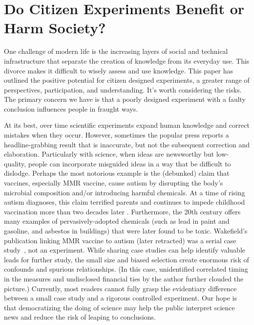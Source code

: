 \section{Do Citizen  Experiments Benefit or Harm Society?}
One challenge of modern life is the increasing layers of social and technical infrastructure that separate the creation of knowledge from its everyday use. This divorce makes it difficult to wisely assess and use knowledge. This paper has outlined the positive potential for citizen designed experiments, a greater range of perspectives, participation, and understanding. It’s worth considering the risks. The primary concern we have is that a poorly designed experiment with a faulty conclusion influences people in fraught ways.
 
At its best, over time scientific experiments expand human knowledge and correct mistakes when they occur. However, sometimes the popular press reports a headline-grabbing result that is inaccurate, but not the subsequent correction and elaboration. Particularly with science, when ideas are newsworthy but low-quality, people can incorporate misguided ideas in a way that be difficult to dislodge. Perhaps the most notorious example is the (debunked) claim that vaccines, especially MMR vaccine, cause autism by disrupting the body’s microbial composition  and/or introducing harmful chemicals. At a time of rising autism diagnoses, this claim terrified parents and continues to impede childhood vaccination more than two decades later . Furthermore, the 20th century offers many examples of pervasively-adopted chemicals (such as lead in paint and gasoline, and asbestos in buildings) that were later found to be toxic. Wakefield’s publication linking MMR vaccine to autism (later retracted) was a serial case study~\cite{Godleec7452}, not an experiment. While sharing case studies can help identify valuable leads for further study, the small size and biased selection create enormous risk of confounds and spurious relationships. (In this case, unidentified correlated timing in the measures and undisclosed financial ties by the author further clouded the picture.) Currently, most readers cannot fully grasp the evidentiary difference between a small case study and a rigorous controlled experiment. Our hope is that democratizing the doing of science may help the public interpret science news and reduce the risk of leaping to conclusions.

